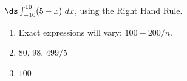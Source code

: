 {$\ds \int_{-10}^{10} (5-x)\ dx$, using the Right Hand Rule.
}
{\begin{enumerate}
\item		Exact expressions will vary; $100-200/n$.
\item		$80$, $98$, $499/5$
\item		$100$
\end{enumerate}
}

